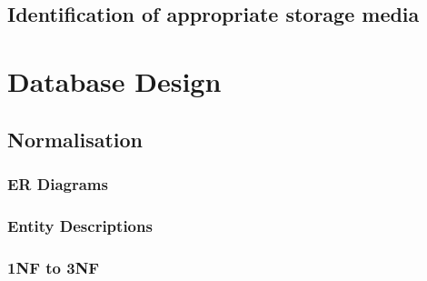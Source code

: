 \begin{itemize}
\subsection{Identification of appropriate storage media}

\section{Database Design}

\subsection{Normalisation}

\subsubsection{ER Diagrams}

\subsubsection{Entity Descriptions}

\subsubsection{1NF to 3NF}

\pagebreak


\end{itemize}

